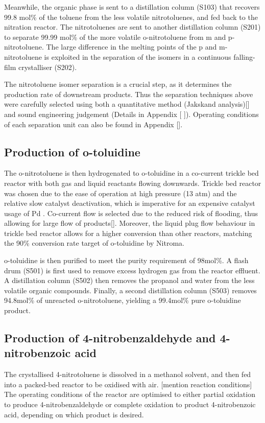 Meanwhile, the organic phase is sent to a distillation column (S103) that recovers 99.8 mol\% of the toluene from the less volatile nitrotoluenes, and fed back to the nitration reactor. The nitrotoluenes are sent to another distillation column (S201) to separate 99.99 mol\% of the more volatile o-nitrotoluene from m and p-nitrotoluene. The large difference in the melting points of the p and m-nitrotoluene is exploited in the separation of the isomers in a continuous falling-film crystalliser (S202). 

The nitrotoluene isomer separation is a crucial step, as it determines the production rate of downstream products. Thus the separation techniques above were carefully selected using both a quantitative method (Jakskand analysis)[] and sound engineering judgement (Details in Appendix [ ]). Operating conditions of each separation unit can also be found in Appendix []. 

\subsection{Production of o-toluidine}
The o-nitrotoluene is then hydrogenated to o-toluidine in a co-current trickle bed reactor with both gas and liquid reactants flowing downwards. Trickle bed reactor was chosen due to the ease of operation at high pressure (13 atm) and the relative slow catalyst deactivation, which is imperative for an expensive catalyst usage of Pd \cite{vemala_hydrodynamic_nodate}. Co-current flow is selected due to the reduced risk of flooding, thus allowing for large flow of products[]. Moreover, the liquid plug flow behaviour in trickle bed reactor allows for a higher conversion than other reactors, matching the 90\% conversion rate target of o-toluidine by Nitroma. 

o-toluidine is then purified to meet the purity requirement of 98mol\%. A flash drum (S501) is first used to remove excess hydrogen gas from the reactor effluent. A distillation column (S502) then removes the propanol and water from the less volatile organic compounds. Finally, a second distillation column (S503) removes 94.8mol\% of unreacted o-nitrotoluene, yielding a 99.4mol\% pure o-toluidine product.
 
\subsection{Production of 4-nitrobenzaldehyde and 4-nitrobenzoic acid}
The crystallised 4-nitrotoluene is dissolved in a methanol solvent, and then fed into a packed-bed reactor to be oxidised with air. [mention reaction conditions] The operating conditions of the reactor are optimised to either partial oxidation to produce 4-nitrobenzaldehyde or complete oxidation to product 4-nitrobenzoic acid, depending on which product is desired.  

